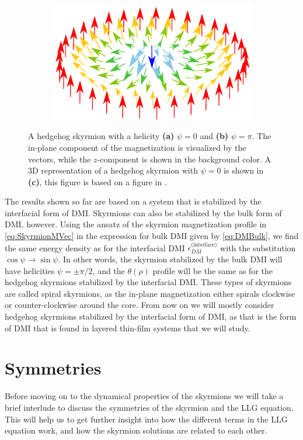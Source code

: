 \begin{figure}[h!]
\begin{subfigure}{.49\textwidth}
  \includegraphics[width=\linewidth]{Figures/HedgehogSkyrmion}
  \caption{}
  \label{fig:HedgehogSkyrmion3}
\end{subfigure}
\caption{A hedgehog skyrmion with a helicity \textbf{(a)} $\psi = 0$ and \textbf{(b)} $\psi = \pi$. The in-plane component of the magnetization is visualized by the vectors, while the $z$-component is shown in the background color. A 3D representation of a hedgehog skyrmion with $\psi = 0$ is shown in \textbf{(c)}, this figure is based on a figure in \cite{EverschorDissertation}.}
\label{fig:HedgehogSkyrmions}
\end{figure}

The results shown so far are based on a system that is stabilized by the interfacial form of DMI. Skyrmions can also be stabilized by the bulk form of DMI, however. Using the ansatz of the skyrmion magnetization profile in \eqref{eq:SkyrmionMVec} in the expression for bulk DMI given by \eqref{eq:DMBulk}, we find the same energy density as for the interfacial DMI $\epsilon_{DM}^{\textrm{(interface)}}$ with the substitution $\cos\psi \rightarrow \sin\psi$. In other words, the skyrmion stabilized by the bulk DMI will have helicities $\psi=\pm\pi/2$, and the $\theta(\rho)$ profile will be the same as for the hedgehog skyrmions stabilized by the interfacial DMI. These types of skyrmions are called spiral skyrmions, as the in-plane magnetization either spirals clockwise or counter-clockwise around the core. From now on we will mostly consider hedgehog skyrmions stabilized by the interfacial form of DMI, as that is the form of DMI that is found in layered thin-film systems that we will study.

\section{Symmetries}
Before moving on to the dynamical properties of the skyrmions we will take a brief interlude to discuss the symmetries of the skyrmion and the LLG equation. This will help us to get further insight into how the different terms in the LLG equation work, and how the skyrmion solutions are related to each other.
